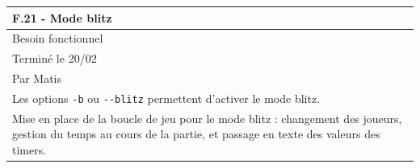 \documentclass[a4paper,12pt]{article}
\begin{document}
\noindent
\setlength{\arrayrulewidth}{1.5pt}
\renewcommand{\arraystretch}{1.5}
\begin{tabularx}{\textwidth}{|X|}
    \hline
    \textbf{F.21 - Mode blitz}                                                                                                                                         \\
    \hline
    Besoin fonctionnel                                                                                                                                                 \\
    \hline
    Terminé le 20/02                                                                                                                                                   \\
    Par Matis                                                                                                                                                          \\
    \hline
    Les options \texttt{-b} ou \texttt{-}\texttt{-blitz} permettent d’activer le mode blitz.                                                                           \\
    Mise en place de la boucle de jeu pour le mode blitz : changement des joueurs, gestion du temps au cours de la partie, et passage en texte des valeurs des timers. \\


\end{tabularx}
\end{document}
